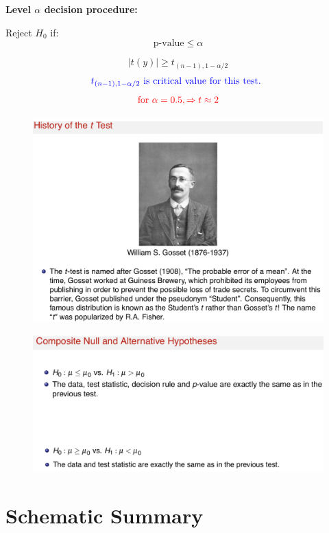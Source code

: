 \documentclass[14pt]{extarticle}
\begin{document}
\textbf{Level \(\alpha\) decision procedure: }

\quad Reject \( H_0 \) if: 
\[
\text{p-value} \leq \alpha
\]

\quad {}
\[
|t(y)| \geq t_{(n-1), 1-\alpha/2}
\]
\[\textcolor{blue}{t_{(n-1), 1-\alpha/2} \text{ is critical value for this test. }}\]
\[\textcolor{red}{\text{for } \alpha = 0.5, \Rightarrow t \approx 2}\]

\clearpage
\begin{figure}[H]
    \centering
    \includegraphics[width=1\textwidth]{fig6.png}
\end{figure}

\begin{figure}[H]
    \centering
    \includegraphics[width=1\textwidth]{fig7.png}
\end{figure}


\newpage
\section*{Schematic Summary}
\end{document}
